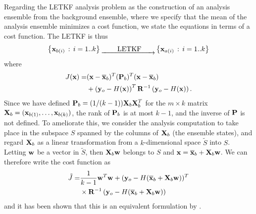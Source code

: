 \documentclass[12pt]{report}
\begin{document}
Regarding the LETKF analysis problem as the construction of an analysis ensemble from the background ensemble, where we specify that the mean of the analysis ensemble minimizes a cost function, we state the equations in terms of a cost function.
The LETKF is thus
\begin{equation} \left\{ \mathbf{x} _{b(i)}\,:\, i=1..k \right\} \underrightarrow{~~~~~~~\text{LETKF}~~~~~~} \left\{ \mathbf{x} _{a(i)}\,:\,i=1..k\right\} \end{equation}
where
\begin{align*} J(\mathbf{x}) = &(\mathbf{x} - \overline{\mathbf{x}}_b) ^T (\mathbf{P}_b)^T(\mathbf{x} - \overline{\mathbf{x}}_b)\\
&+\left(\mathbf{y}_o-H(\mathbf{x})\right)^T \mathbf{R}^{-1} \left(\mathbf{y}_o-H(\mathbf{x})\right). \end{align*}
Since we have defined $\mathbf{P}_b = (1/(k-1))\mathbf{X}_b \mathbf{X}_b^T$ for the $m\times k$ matrix $\mathbf{X}_b = (\mathbf{x}_{b(1)},\ldots,\mathbf{x}_{b(k)})$, the rank of $\mathbf{P}_b$ is at most $k-1$, and the inverse of $\mathbf{P}$ is not defined.
To ameliorate this, we consider the analysis computation to take place in the subspace $S$ spanned by the columns of $\mathbf{X}_b$ (the ensemble states), and regard $\mathbf{X}_b$ as a linear transformation from a $k$-dimensional space $\tilde{S}$ into $S$.
Letting $\mathbf{w}$ be a vector in $\tilde{S}$, then $\mathbf{X}_b\mathbf{w}$ belongs to $S$ and $\mathbf{x} = \overline{\mathbf{x}}_b + \mathbf{X}_b \mathbf{w}$.
We can therefore write the cost function as
\begin{align*} \tilde{J} = &\frac{1}{k-1}\mathbf{w}^T\mathbf{w} + (\mathbf{y}_o - H(\overline{\mathbf{x}}_b+\mathbf{X}_b\mathbf{w}))^T\\
&\times \mathbf{R}^{-1}\left(\mathbf{y}_o - H(\overline{\mathbf{x}}_b+\mathbf{X}_b\mathbf{w})\right)\end{align*}
and it has been shown that this is an equivalent formulation by .
\end{document}
